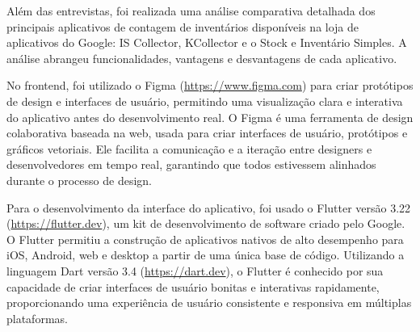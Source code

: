 Além das entrevistas, foi realizada uma análise comparativa detalhada dos principais aplicativos de contagem de inventários disponíveis na loja de aplicativos do Google: IS Collector, KCollector e o Stock e Inventário Simples. A análise abrangeu funcionalidades, vantagens e desvantagens de cada aplicativo.


No frontend, foi utilizado o Figma (\url{https://www.figma.com}) para criar protótipos de design e interfaces de usuário, permitindo uma visualização clara e interativa do aplicativo antes do desenvolvimento real. O Figma é uma ferramenta de design colaborativa baseada na web, usada para criar interfaces de usuário, protótipos e gráficos vetoriais. Ele facilita a comunicação e a iteração entre designers e desenvolvedores em tempo real, garantindo que todos estivessem alinhados durante o processo de design.


Para o desenvolvimento da interface do aplicativo, foi usado o Flutter versão 3.22 (\url{https://flutter.dev}), um kit de desenvolvimento de software criado pelo Google. O Flutter permitiu a construção de aplicativos nativos de alto desempenho para iOS, Android, web e desktop a partir de uma única base de código. Utilizando a linguagem Dart versão 3.4 (\url{https://dart.dev}), o Flutter é conhecido por sua capacidade de criar interfaces de usuário bonitas e interativas rapidamente, proporcionando uma experiência de usuário consistente e responsiva em múltiplas plataformas.

